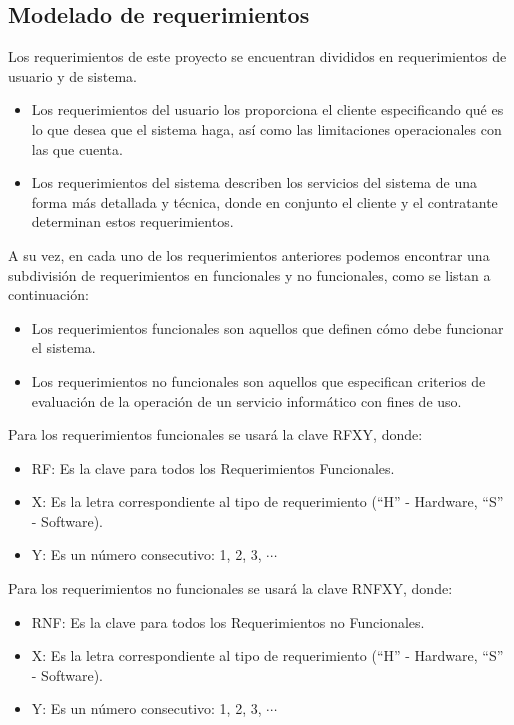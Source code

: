 %

\subsection{Modelado de requerimientos}

Los requerimientos de este proyecto se encuentran divididos en requerimientos de 
usuario y de sistema.
\begin{itemize}
	\item Los requerimientos del usuario los proporciona el cliente 
	especificando qué es lo que desea que el sistema haga, así como las 
	limitaciones operacionales con las que cuenta.
	\item Los requerimientos del sistema describen los servicios del sistema 
	de una forma más detallada y técnica, donde en conjunto el cliente y el 
	contratante determinan estos requerimientos.
\end{itemize}

A su vez, en cada uno de los requerimientos anteriores podemos encontrar una 
subdivisión de requerimientos en funcionales y no funcionales, como se listan a 
continuación:

\begin{itemize}
	\item Los requerimientos funcionales son aquellos que definen cómo debe 
	funcionar el sistema.
	\item Los requerimientos no funcionales son aquellos que especifican 
	criterios de evaluación  de la operación de un servicio informático con 
	fines de uso.
\end{itemize}

Para los requerimientos funcionales se usará la clave RFXY, donde:
\begin{itemize}
	\item RF: Es la clave para todos los Requerimientos Funcionales.
	\item X: Es la letra correspondiente al tipo de requerimiento (“H” - 
	Hardware, “S” - Software).
	\item Y: Es un número consecutivo: 1, 2, 3, $\cdots$
\end{itemize}

Para los requerimientos no funcionales se usará la clave RNFXY, donde:
\begin{itemize}
	\item RNF: Es la clave para todos los Requerimientos no Funcionales.
	\item X: Es la letra correspondiente al tipo de requerimiento (“H” - 
	Hardware, “S” - Software).
	\item Y: Es un número consecutivo: 1, 2, 3, $\cdots$
\end{itemize}

